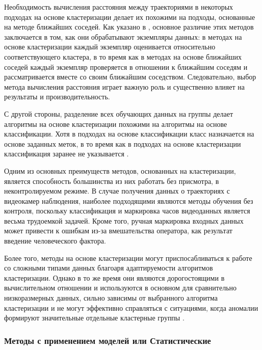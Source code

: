 Необходимость вычисления расстояния между траекториями в некоторых подходах на основе кластеризации делает их похожими на подходы, основанные на методе ближайших соседей. Как указано в \cite{article:15_survey_ad}, основное различие этих методов заключается в том, как они обрабатывают экземпляры данных: в методах на основе кластеризации каждый экземпляр оценивается относительно соответствующего кластера, в то время как в методах на основе ближайших соседей каждый экземпляр проверяется в отношении к ближайшим соседям и рассматривается вместе со своим ближайшим соседством. Следовательно, выбор метода вычисления расстояния играет важную роль и существенно влияет на результаты и производительность.

С другой стороны, разделение всех обучающих данных на группы делает алгоритмы на основе кластеризации похожими на алгоритмы на основе классификации. Хотя в подходах на основе классификации класс назначается на основе заданных меток, в то время как в подходах на основе кластеризации классификация заранее не указывается \cite{inproceedings:18_ardod_lstd}.

Одним из основных преимуществ методов, основанных на кластеризации, является способность большинства из них работать без присмотра, в неконтролируемом режиме. В случае получения данных о траекториях с видеокамер наблюдения, наиболее подходящими являются методы обучения без контроля, поскольку классификация и маркировка часов видеоданных является весьма трудоемкой задачей. Кроме того, ручная маркировка входных данных может привести к ошибкам из-за вмешательства оператора, как результат введение человеческого фактора.

Более того, методы на основе кластеризации могут приспосабливаться к работе со сложными типами данных благоаря адаптируемости алгоритмов кластеризации. Однако в то же время они являются дорогостоящими в вычислительном отношении и используются в основном для сравнительно низкоразмерных данных, сильно зависимы от выбранного алгоритма кластеризации и не могут эффективно справляться с ситуациями, когда аномалии формируют значительные отдельные кластерные группы \cite{article:15_survey_ad}.

\subsubsection{Методы с применением моделей  \cite{article:6_survey_anom_det_rtuvs}\cite{inproceedings:18_ardod_lstd} или Статистические \cite{article:15_survey_ad}}

